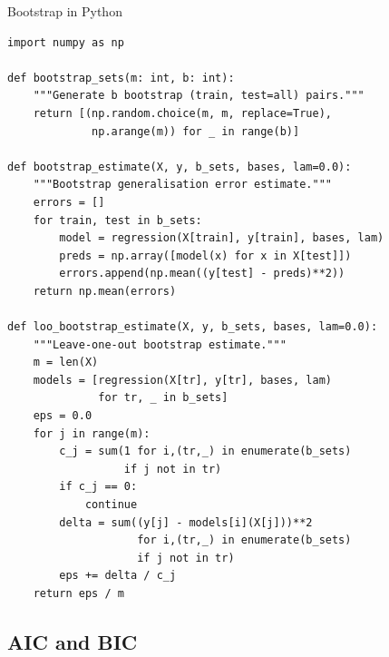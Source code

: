 \documentclass[aspectratio=169,10pt]{beamer}
\begin{document}
\begin{frame}[fragile]{Bootstrap in Python}
\begin{lstlisting}[style=python, caption={Bootstrap error estimation (Algorithm 17.12/17.13 equivalent)}]
import numpy as np

def bootstrap_sets(m: int, b: int):
    """Generate b bootstrap (train, test=all) pairs."""
    return [(np.random.choice(m, m, replace=True),
             np.arange(m)) for _ in range(b)]

def bootstrap_estimate(X, y, b_sets, bases, lam=0.0):
    """Bootstrap generalisation error estimate."""
    errors = []
    for train, test in b_sets:
        model = regression(X[train], y[train], bases, lam)
        preds = np.array([model(x) for x in X[test]])
        errors.append(np.mean((y[test] - preds)**2))
    return np.mean(errors)

def loo_bootstrap_estimate(X, y, b_sets, bases, lam=0.0):
    """Leave-one-out bootstrap estimate."""
    m = len(X)
    models = [regression(X[tr], y[tr], bases, lam)
              for tr, _ in b_sets]
    eps = 0.0
    for j in range(m):
        c_j = sum(1 for i,(tr,_) in enumerate(b_sets)
                  if j not in tr)
        if c_j == 0:
            continue
        delta = sum((y[j] - models[i](X[j]))**2
                    for i,(tr,_) in enumerate(b_sets)
                    if j not in tr)
        eps += delta / c_j
    return eps / m
\end{lstlisting}
\end{frame}

\subsection{AIC and BIC}
\end{document}
